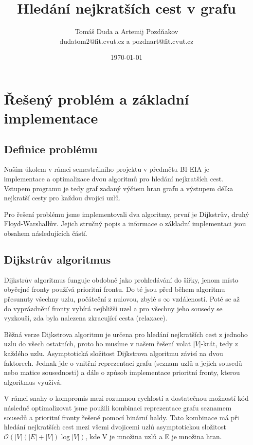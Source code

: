 \documentclass[a4paper,11pt]{article}
\title{Hledání nejkratších cest v grafu}
\date{\today}
\author{Tomáš Duda a Artemij Pozdňakov \\ dudatom2@fit.cvut.cz a pozdnart@fit.cvut.cz}
\begin{document}
\maketitle
\newpage

\tableofcontents
\newpage

\section{Řešený problém a základní implementace}
\subsection{Definice problému}
Naším úkolem v rámci semestrálního projektu v předmětu BI-EIA je implementace a optimalizace dvou algoritmů pro hledání nejkratších cest. Vstupem programu je tedy graf zadaný výčtem hran grafu a výstupem délka nejkratší cesty pro každou dvojici uzlů.
\par
Pro řešení problému jsme implementovali dva algoritmy, první je Dijk\-strův, druhý Floyd-Warshallův. Jejich stručný popis a informace o základní implementaci jsou obsahem ná\-sle\-dujících částí.

\subsection{Dijkstrův algoritmus}
Dijkstrův algoritmus funguje obdobně jako prohledávání do šířky, jenom místo obyčejné fronty používá prioritní frontu. Do té jsou před během algoritmu přesunuty všechny uzlu, počáteční z nulovou, zbylé s $\infty$ vzdáleností. Poté se až do vyprázdnění fronty vybírá nejbližší uzel a pro všechny jeho sousedy se vyzkouší, zda byla nalezena zkracující cesta (relaxace). 
\par
Běžná verze Dijkstrova algoritmu je určena pro hledání nejkratších cest z jednoho uzlu do všech ostatních, proto ho musíme v našem řešení volat $|V|$-krát, tedy z každého uzlu. Asymptotická složitost Dijkstrova algoritmu závisí na dvou faktorech. Jednak jde o vnitřní reprezentaci grafu (seznam uzlů a jejich sousedů nebo matice sousednosti) a dále o způsob implementace prioritní fronty, kterou algoritmus využívá.
\par
V rámci snahy o kompromis mezi rozumnou rychlostí a dostatečnou možností kód následně optimalizovat jsme použili kombinaci reprezentace grafu seznamem sousedů a prioritní fronty řešené pomocí binární haldy. Tato kombinace má při hledání nejkratších cest mezi všemi dvojicemi uzlů asymptotickou složitost $\mathcal{O}(|V|(|E|+|V|)\log{|V|})$, kde V je množina uzlů a E je množina hran.
\end{document}
